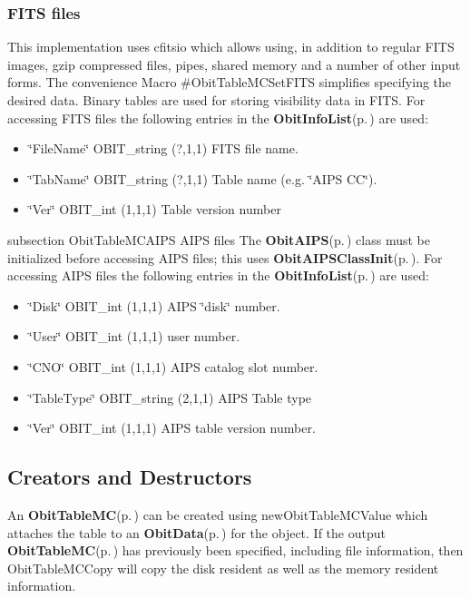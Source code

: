 \subsubsection{FITS files}\label{ObitTableWX_8h_TableFITS}
This implementation uses cfitsio which allows using, in addition to regular FITS images, gzip compressed files, pipes, shared memory and a number of other input forms. The convenience Macro \#Obit\-Table\-MCSet\-FITS simplifies specifying the desired data. Binary tables are used for storing visibility data in FITS. For accessing FITS files the following entries in the {\bf Obit\-Info\-List}{\rm (p.\,\pageref{structObitInfoList})} are used: \begin{itemize}
\item \char`\"{}File\-Name\char`\"{} OBIT\_\-string (?,1,1) FITS file name. \item \char`\"{}Tab\-Name\char`\"{} OBIT\_\-string (?,1,1) Table name (e.g. \char`\"{}AIPS CC\char`\"{}). \item \char`\"{}Ver\char`\"{} OBIT\_\-int (1,1,1) Table version number\end{itemize}
subsection Obit\-Table\-MCAIPS AIPS files The {\bf Obit\-AIPS}{\rm (p.\,\pageref{structObitAIPS})} class must be initialized before accessing AIPS files; this uses {\bf Obit\-AIPSClass\-Init}{\rm (p.\,\pageref{ObitAIPS_8c_a5})}. For accessing AIPS files the following entries in the {\bf Obit\-Info\-List}{\rm (p.\,\pageref{structObitInfoList})} are used: \begin{itemize}
\item \char`\"{}Disk\char`\"{} OBIT\_\-int (1,1,1) AIPS \char`\"{}disk\char`\"{} number. \item \char`\"{}User\char`\"{} OBIT\_\-int (1,1,1) user number. \item \char`\"{}CNO\char`\"{} OBIT\_\-int (1,1,1) AIPS catalog slot number. \item \char`\"{}Table\-Type\char`\"{} OBIT\_\-string (2,1,1) AIPS Table type \item \char`\"{}Ver\char`\"{} OBIT\_\-int (1,1,1) AIPS table version number.\end{itemize}
\subsection{Creators and Destructors}\label{ObitTableMC_8h_ObitTableMCaccess}
An {\bf Obit\-Table\-MC}{\rm (p.\,\pageref{structObitTableMC})} can be created using new\-Obit\-Table\-MCValue which attaches the table to an {\bf Obit\-Data}{\rm (p.\,\pageref{structObitData})} for the object. If the output {\bf Obit\-Table\-MC}{\rm (p.\,\pageref{structObitTableMC})} has previously been specified, including file information, then Obit\-Table\-MCCopy will copy the disk resident as well as the memory resident information.


